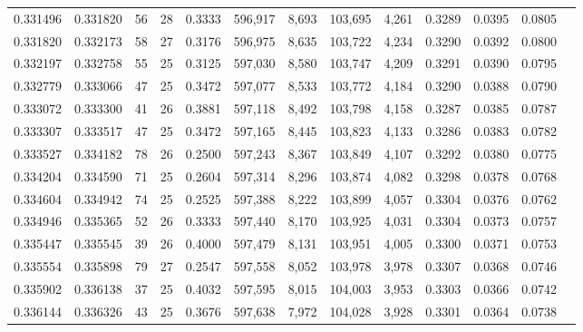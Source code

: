 \begin{tabular}{rrrrrrrrrrrrr}
0.331496 & 0.331820 &  56 &  28 &                                     0.3333 & 596,917 &   8,693 & 103,695 &   4,261 & 0.3289 & 0.0395 & 0.0805 \\
0.331820 & 0.332173 &  58 &  27 &                                     0.3176 & 596,975 &   8,635 & 103,722 &   4,234 & 0.3290 & 0.0392 & 0.0800 \\
0.332197 & 0.332758 &  55 &  25 &                                     0.3125 & 597,030 &   8,580 & 103,747 &   4,209 & 0.3291 & 0.0390 & 0.0795 \\
0.332779 & 0.333066 &  47 &  25 &                                     0.3472 & 597,077 &   8,533 & 103,772 &   4,184 & 0.3290 & 0.0388 & 0.0790 \\
0.333072 & 0.333300 &  41 &  26 &                                     0.3881 & 597,118 &   8,492 & 103,798 &   4,158 & 0.3287 & 0.0385 & 0.0787 \\
0.333307 & 0.333517 &  47 &  25 &                                     0.3472 & 597,165 &   8,445 & 103,823 &   4,133 & 0.3286 & 0.0383 & 0.0782 \\
0.333527 & 0.334182 &  78 &  26 &                                     0.2500 & 597,243 &   8,367 & 103,849 &   4,107 & 0.3292 & 0.0380 & 0.0775 \\
0.334204 & 0.334590 &  71 &  25 &                                     0.2604 & 597,314 &   8,296 & 103,874 &   4,082 & 0.3298 & 0.0378 & 0.0768 \\
0.334604 & 0.334942 &  74 &  25 &                                     0.2525 & 597,388 &   8,222 & 103,899 &   4,057 & 0.3304 & 0.0376 & 0.0762 \\
0.334946 & 0.335365 &  52 &  26 &                                     0.3333 & 597,440 &   8,170 & 103,925 &   4,031 & 0.3304 & 0.0373 & 0.0757 \\
0.335447 & 0.335545 &  39 &  26 &                                     0.4000 & 597,479 &   8,131 & 103,951 &   4,005 & 0.3300 & 0.0371 & 0.0753 \\
0.335554 & 0.335898 &  79 &  27 &                                     0.2547 & 597,558 &   8,052 & 103,978 &   3,978 & 0.3307 & 0.0368 & 0.0746 \\
0.335902 & 0.336138 &  37 &  25 &                                     0.4032 & 597,595 &   8,015 & 104,003 &   3,953 & 0.3303 & 0.0366 & 0.0742 \\
0.336144 & 0.336326 &  43 &  25 &                                     0.3676 & 597,638 &   7,972 & 104,028 &   3,928 & 0.3301 & 0.0364 & 0.0738 \\

\end{tabular}
